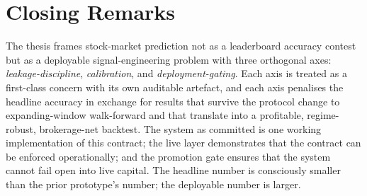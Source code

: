 \section{Closing Remarks}

The thesis frames stock-market prediction not as a leaderboard accuracy contest but as a deployable signal-engineering problem with three orthogonal axes: \emph{leakage-discipline}, \emph{calibration}, and \emph{deployment-gating}. Each axis is treated as a first-class concern with its own auditable artefact, and each axis penalises the headline accuracy in exchange for results that survive the protocol change to expanding-window walk-forward and that translate into a profitable, regime-robust, brokerage-net backtest. The system as committed is one working implementation of this contract; the live layer demonstrates that the contract can be enforced operationally; and the promotion gate ensures that the system cannot fail open into live capital. The headline number is consciously smaller than the prior prototype's number; the deployable number is larger.
